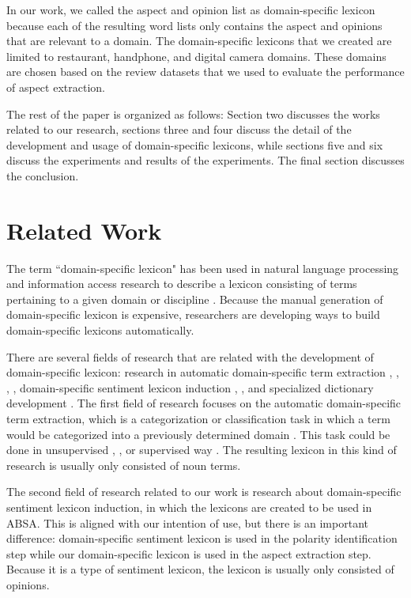\documentclass[a4paper,conference]{IEEEtran}
\begin{document}
In our work, we called the aspect and opinion list as domain-specific lexicon because each of the resulting word lists only contains the aspect and opinions that are relevant to a domain. The domain-specific lexicons that we created are limited to restaurant, handphone, and digital camera domains. These domains are chosen based on the review datasets that we used to evaluate the performance of aspect extraction.

The rest of the paper is organized as follows: Section two discusses the works related to our research, sections three and four discuss the detail of the development and usage of domain-specific lexicons, while sections five and six discuss the experiments and results of the experiments. The final section discusses the conclusion. 

\section{Related Work}
The term ``domain-specific lexicon" has been used in natural language processing and information access research to describe a lexicon consisting of terms pertaining to a given domain or discipline \cite{b3}. Because the manual generation of domain-specific lexicon is expensive, researchers are developing ways to build domain-specific lexicons automatically.

\IEEEpubidadjcol

There are several fields of research that are related with the development of domain-specific lexicon: research in automatic domain-specific term extraction \cite{b3}, \cite{b4}, \cite{b5}, \cite{b6}, domain-specific sentiment lexicon induction \cite{b7}, \cite{b8}, and specialized dictionary development \cite{b9}. The first field of research focuses on the automatic domain-specific term extraction, which is a categorization or classification task in which a term would be categorized into a previously determined domain \cite{b4}. This task could be done in unsupervised \cite{b3}, \cite{b4}, \cite{b5} or supervised way \cite{b6}. The resulting lexicon in this kind of research is usually only consisted of noun terms.

The second field of research related to our work is research about domain-specific sentiment lexicon induction, in which the lexicons are created to be used in ABSA. This is aligned with our intention of use, but there is an important difference: domain-specific sentiment lexicon is used in the polarity identification step while our domain-specific lexicon is used in the aspect extraction step. Because it is a type of sentiment lexicon, the lexicon is usually only consisted of opinions.
\end{document}

